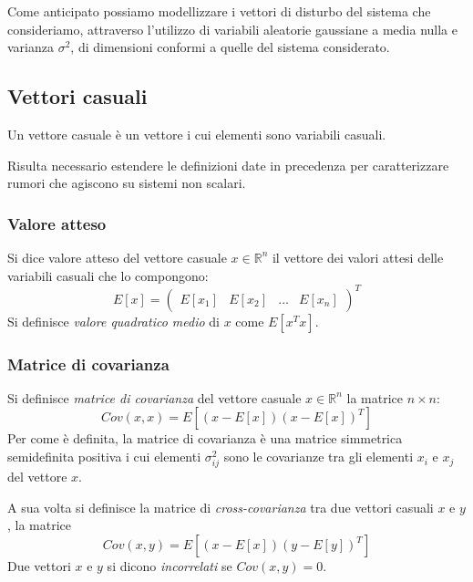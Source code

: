 Come anticipato possiamo modellizzare i vettori di disturbo del sistema che consideriamo, attraverso l'utilizzo di variabili aleatorie gaussiane a media nulla e varianza $\sigma^2$, di dimensioni conformi a quelle del sistema considerato.

\newpage
\subsection{Vettori casuali}

Un vettore casuale è un vettore i cui elementi sono variabili casuali.

Risulta necessario estendere le definizioni date in precedenza per caratterizzare rumori che agiscono su sistemi non scalari.

\subsubsection{Valore atteso}

Si dice valore atteso del vettore casuale $x \in \mathbb{R}^n$ il vettore dei valori attesi delle variabili casuali che lo compongono: 
\begin{equation}
E[x] = \begin{pmatrix}
E[x_1] & E[x_2] & \dots & E[x_n]
\end{pmatrix}^T
\end{equation}
Si definisce \textit{valore quadratico medio} di $x$ come $E[x^T x]$.

\subsubsection{Matrice di covarianza}

Si definisce \textit{matrice di covarianza} del vettore casuale $x \in \mathbb{R}^n$ la matrice $n \times n$: \begin{equation}
 Cov(x, x) = E[(x-E[x])(x-E[x])^T]
\end{equation}
Per come è definita, la matrice di covarianza è una matrice simmetrica semidefinita positiva i cui elementi $\sigma^2_{ij}$ sono le covarianze tra gli elementi $x_i$ e $x_j$ del vettore $x$.

A sua volta si definisce la matrice di \textit{cross-covarianza} tra due vettori casuali $x$ e $y$, la matrice
\begin{equation}
 Cov(x, y) = E[(x-E[x])(y-E[y])^T]
\end{equation}
Due vettori $x$ e $y$ si dicono \textit{incorrelati} se $Cov(x,y) = 0$.
\newpage